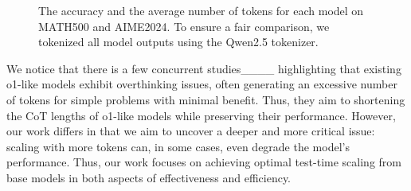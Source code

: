 \begin{figure*}[t]
  \centering
  \caption{The accuracy and the average number of tokens for each model on MATH500 and AIME2024. To ensure a fair comparison, we tokenized all model outputs using the Qwen2.5 tokenizer.}
  \label{fig: o1-like models acc and tokens}
  \vskip -0.05in
\end{figure*}


We notice that there is a few concurrent studies____ highlighting that existing o1-like models exhibit overthinking issues, often generating an excessive number of tokens for simple problems with minimal benefit. Thus, they aim to shortening the CoT lengths of o1-like models while preserving their performance. However, our work differs in that we aim to uncover a deeper and more critical issue: scaling with more tokens can, in some cases, even degrade the model's performance. Thus, our work focuses on achieving optimal test-time scaling from base models in both aspects of effectiveness and efficiency.